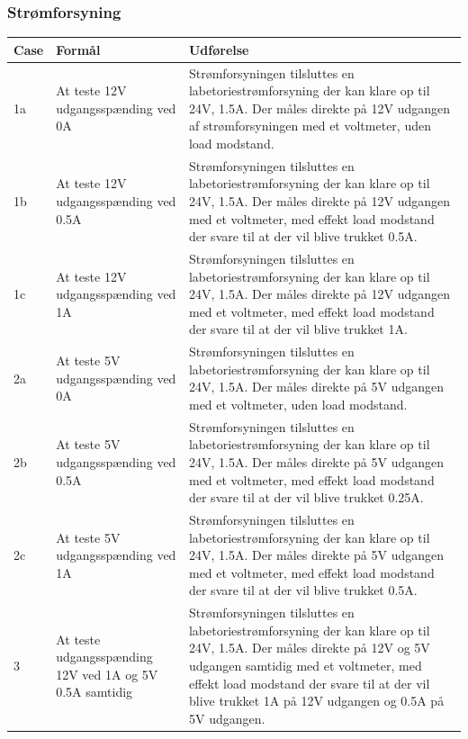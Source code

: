\subsubsection{Strømforsyning}
\begin{table}[H]
\centering
\begin{tabular}{| p{1cm}  | p{4.5cm} | p{8cm} |}
\hline
Case &Formål &Udførelse\\\hline
1a &At teste 12V udgangsspænding ved 0A &Strømforsyningen tilsluttes en labetoriestrømforsyning der kan klare op til 24V, 1.5A. Der måles direkte på 12V udgangen af strømforsyningen med et voltmeter, uden load modstand.\\\hline
1b &At teste 12V udgangsspænding ved 0.5A  &Strømforsyningen tilsluttes en labetoriestrømforsyning der kan klare op til 24V, 1.5A. Der måles direkte på 12V udgangen med et voltmeter, med effekt  load modstand der svare til at der vil blive trukket 0.5A.\\\hline
1c &At teste 12V udgangsspænding ved 1A  &Strømforsyningen tilsluttes en labetoriestrømforsyning der kan klare op til 24V, 1.5A.  Der måles direkte på 12V udgangen med et voltmeter, med effekt  load modstand der svare til at der vil blive trukket 1A.\\\hline
2a &At teste 5V udgangsspænding ved 0A &Strømforsyningen tilsluttes en labetoriestrømforsyning der kan klare op til 24V, 1.5A. Der måles direkte på 5V udgangen med et voltmeter, uden load modstand.\\\hline
2b &At teste 5V udgangsspænding ved 0.5A  &Strømforsyningen tilsluttes en labetoriestrømforsyning der kan klare op til 24V, 1.5A. Der måles direkte på 5V udgangen med et voltmeter, med effekt  load modstand der svare til at der vil blive trukket 0.25A.\\\hline
2c &At teste 5V udgangsspænding ved 1A  &Strømforsyningen tilsluttes en labetoriestrømforsyning der kan klare op til 24V, 1.5A.  Der måles direkte på 5V udgangen med et voltmeter, med effekt  load modstand der svare til at der vil blive trukket 0.5A.\\\hline
3 &At teste udgangsspænding 12V ved 1A og 5V 0.5A samtidig & Strømforsyningen tilsluttes en labetoriestrømforsyning der kan klare op til 24V, 1.5A. Der måles direkte på 12V og 5V udgangen samtidig med et voltmeter, med effekt load modstand der svare til at der vil blive trukket 1A på 12V udgangen og 0.5A på 5V udgangen. \\\hline
\end{tabular}
\end{table}

